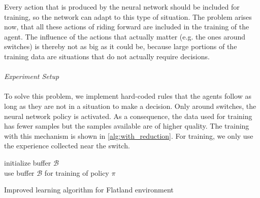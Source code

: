 Every action that is produced by the neural network should be included for training, so the network can adapt to this type of situation. The problem arises now, that all these actions of riding forward are included in the training of the agent. The influence of the actions that actually matter (e.g. the ones around switches) is thereby not as big as it could be, because large portions of the training data are situations that do not actually require decisions.\\\\
\textit{Experiment Setup}\\\\
To solve this problem, we implement hard-coded rules that the agents follow as long as they are not in a situation to make a decision. Only around switches, the neural network policy is activated. As a consequence, the data used for training has fewer samples but the samples available are of higher quality. The training with this mechanism is shown in \autoref{alg:with_reduction}.
For training, we only use the experience collected near the switch.\\
\begin{algorithm}[H]
	initialize buffer $\mathcal{B}$\\
	use buffer $\mathcal{B}$ for training of policy $\pi$
	\caption{Improved learning algorithm for Flatland environment}
	\label{alg:with_reduction}
\end{algorithm}
